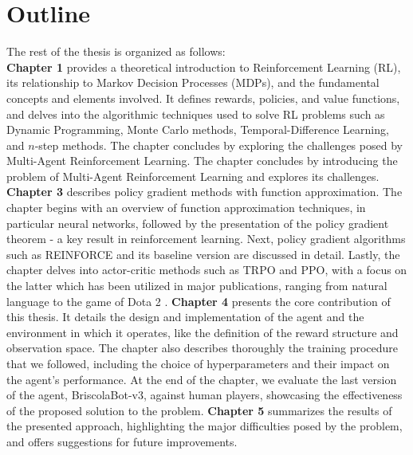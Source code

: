 \section{Outline}
The rest of the thesis is organized as follows:\\
\textbf{Chapter 1} provides a theoretical introduction to Reinforcement Learning (RL), its relationship to Markov Decision Processes (MDPs), and the fundamental concepts and elements involved. It defines rewards, policies, and value functions, and delves into the algorithmic techniques used to solve RL problems such as Dynamic Programming, Monte Carlo methods, Temporal-Difference Learning, and $n$-step methods. The chapter concludes by exploring the challenges posed by Multi-Agent Reinforcement Learning. The chapter concludes by introducing the problem of Multi-Agent Reinforcement Learning and explores its challenges.
\textbf{Chapter 3} describes policy gradient methods with function approximation. The chapter begins with an overview of function approximation techniques, in particular neural networks, followed by the presentation of the policy gradient theorem - a key result in reinforcement learning. Next, policy gradient algorithms such as REINFORCE and its baseline version are discussed in detail. Lastly, the chapter delves into actor-critic methods such as TRPO and PPO, with a focus on the latter which has been utilized in major publications, ranging from natural language \cite{instruct-gpt} to the game of Dota 2 \cite{open-ai-five}.
\textbf{Chapter 4} presents the core contribution of this thesis. It details the design and implementation of the agent and the environment in which it operates, like the definition of the reward structure and observation space. The chapter also describes thoroughly the training procedure that we followed, including the choice of hyperparameters and their impact on the agent's performance. At the end of the chapter, we evaluate the last version of the agent, BriscolaBot-v3, against human players, showcasing the effectiveness of the proposed solution to the problem.
\textbf{Chapter 5} summarizes the results of the presented approach, highlighting the major difficulties posed by the problem, and offers suggestions for future improvements. 